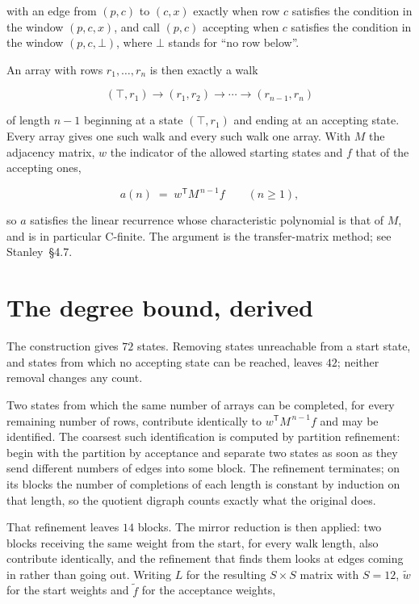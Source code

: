 \documentclass[11pt]{article}
\theoremstyle{definition}
\begin{document}
with an edge from $(p,c)$ to $(c,x)$ exactly when row $c$ satisfies the condition in the window $(p,c,x)$, and call $(p,c)$ accepting when $c$ satisfies the condition in the window $(p,c,\bot)$, where $\bot$ stands for ``no row below''.

An array with rows $r_1,\dots,r_n$ is then exactly a walk

\[(\top,r_1) \to (r_1,r_2) \to \cdots \to (r_{n-1},r_n)\]

of length $n-1$ beginning at a state $(\top,r_1)$ and ending at an accepting state. Every array gives one such walk and every such walk one array. With $M$ the adjacency matrix, $w$ the indicator of the allowed starting states and $f$ that of the accepting ones,

\[a(n) \;=\; w^{\mathsf T} M^{\,n-1} f \qquad (n \ge 1),\]

so $a$ satisfies the linear recurrence whose characteristic polynomial is that of $M$, and is in particular C-finite. The argument is the transfer-matrix method; see Stanley~\S4.7.

\section{The degree bound, derived}

The construction gives $72$ states. Removing states unreachable from a start state, and states from which no accepting state can be reached, leaves $42$; neither removal changes any count.

Two states from which the same number of arrays can be completed, for every remaining number of rows, contribute identically to $w^{\mathsf T}M^{\,n-1}f$ and may be identified. The coarsest such identification is computed by partition refinement: begin with the partition by acceptance and separate two states as soon as they send different numbers of edges into some block. The refinement terminates; on its blocks the number of completions of each length is constant by induction on that length, so the quotient digraph counts exactly what the original does.

That refinement leaves $14$ blocks. The mirror reduction is then applied: two blocks receiving the same weight from the start, for every walk length, also contribute identically, and the refinement that finds them looks at edges coming in rather than going out. Writing $L$ for the resulting $S \times S$ matrix with $S = 12$, $\tilde w$ for the start weights and $\tilde f$ for the acceptance weights,
\end{document}
